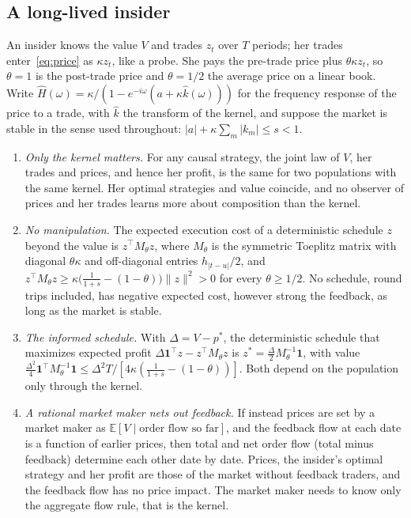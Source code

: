 \subsection{A long-lived insider}

An insider knows the value $V$ and trades $z_t$ over $T$ periods; her trades enter~\eqref{eq:price} as $\kappa z_t$, like a probe. She pays the pre-trade price plus $\theta\kappa z_t$, so $\theta=1$ is the post-trade price and $\theta=1/2$ the average price on a linear book. Write $\hat H(\omega)=\kappa/(1-e^{-i\omega}(a+\kappa\hat k(\omega)))$ for the frequency response of the price to a trade, with $\hat k$ the transform of the kernel, and suppose the market is stable in the sense used throughout: $|a|+\kappa\sum_m|k_m|\le s<1$.

\begin{proposition}\label{prop:insider}
\begin{enumerate}[label=(\roman*),itemsep=1pt]
\item \emph{Only the kernel matters.} For any causal strategy, the joint law of $V$, her trades and prices, and hence her profit, is the same for two populations with the same kernel. Her optimal strategies and value coincide, and no observer of prices and her trades learns more about composition than the kernel.
\item \emph{No manipulation.} The expected execution cost of a deterministic schedule $z$ beyond the value is $z^\top M_\theta z$, where $M_\theta$ is the symmetric Toeplitz matrix with diagonal $\theta\kappa$ and off-diagonal entries $h_{|t-u|}/2$, and $z^\top M_\theta z\ge\kappa\bigl(\frac1{1+s}-(1-\theta)\bigr)\|z\|^2>0$ for every $\theta\ge1/2$. No schedule, round trips included, has negative expected cost, however strong the feedback, as long as the market is stable.
\item \emph{The informed schedule.} With $\Delta=V-p^*$, the deterministic schedule that maximizes expected profit $\Delta\mathbf 1^\top z-z^\top M_\theta z$ is $z^*=\frac\Delta2M_\theta^{-1}\mathbf 1$, with value $\frac{\Delta^2}4\mathbf 1^\top M_\theta^{-1}\mathbf 1\le\Delta^2T/[4\kappa(\frac1{1+s}-(1-\theta))]$. Both depend on the population only through the kernel.
\item \emph{A rational market maker nets out feedback.} If instead prices are set by a market maker as $\mathbb E[V\mid\text{order flow so far}]$, and the feedback flow at each date is a function of earlier prices, then total and net order flow (total minus feedback) determine each other date by date. Prices, the insider's optimal strategy and her profit are those of the market without feedback traders, and the feedback flow has no price impact. The market maker needs to know only the aggregate flow rule, that is the kernel.
\end{enumerate}
\end{proposition}

